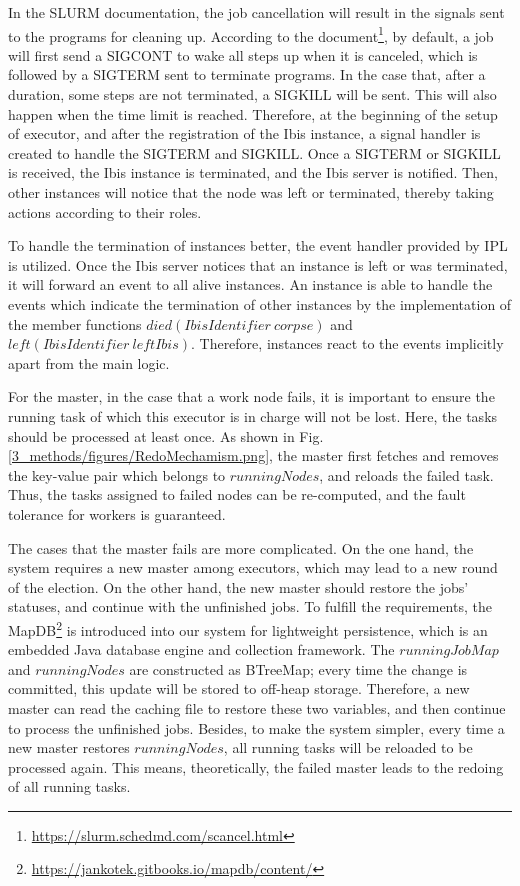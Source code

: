 In the SLURM documentation, the job cancellation will result in the signals sent to the programs for cleaning up. 
According to the document\footnote{\url{https://slurm.schedmd.com/scancel.html}}, by default, a job will first send a SIGCONT to wake all steps up when it is canceled, which is followed by a SIGTERM sent to terminate programs. 
In the case that, after a duration, some steps are not terminated, a SIGKILL will be sent.
This will also happen when the time limit is reached. 
Therefore, at the beginning of the setup of executor, and after the registration of the Ibis instance, a signal handler is created to handle the SIGTERM and SIGKILL. 
Once a SIGTERM or SIGKILL is received, the Ibis instance is terminated, and the Ibis server is notified. 
Then, other instances will notice that the node was left or terminated, thereby taking actions according to their roles.

To handle the termination of instances better, the event handler provided by IPL is utilized. 
Once the Ibis server notices that an instance is left or was terminated, it will forward an event to all alive instances. 
An instance is able to handle the events which indicate the termination of other instances by the implementation of the member functions  $died(IbisIdentifier \ corpse)$ and $left(IbisIdentifier \ leftIbis)$.
Therefore, instances react to the events implicitly apart from the main logic.

For the master, in the case that a work node fails, it is important to ensure the running task of which this executor is in charge will not be lost. 
Here, the tasks should be processed at least once. 
As shown in Fig. \ref{3_methods/figures/RedoMechamism.png}, the master first fetches and removes the key-value pair which belongs to  $runningNodes$, and reloads the failed task. 
Thus, the tasks assigned to failed nodes can be re-computed, and the fault tolerance for workers is guaranteed.

The cases that the master fails are more complicated. On the one hand, the system requires a new master among executors, which may lead to a new round of the election.
On the other hand, the new master should restore the jobs’ statuses, and continue with the unfinished jobs.
To fulfill the requirements, the MapDB\footnote{\url{https://jankotek.gitbooks.io/mapdb/content/}} is introduced into our system for lightweight persistence, which is an embedded Java database engine and collection framework.
The $runningJobMap$ and $runningNodes$ are constructed as BTreeMap; every time the change is committed, this update will be stored to off-heap storage. 
Therefore,  a new master can read the caching file to restore these two variables, and then continue to process the unfinished jobs. 
Besides, to make the system simpler, every time a new master restores  $runningNodes$, all running tasks will be reloaded to be processed again.
This means, theoretically, the failed master leads to the redoing of all running tasks.

